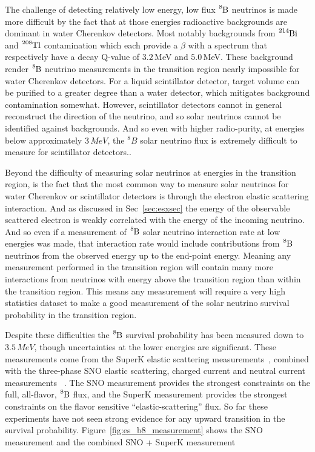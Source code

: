 The challenge of detecting relatively low energy, low flux $\ce{^{8}B}$ neutrinos
is made more difficult by the fact that at those energies radioactive backgrounds
are dominant in water Cherenkov detectors.
Most notably backgrounds from $\ce{^{214}Bi}$ and $\ce{^{208}Tl}$ contamination
which each provide a $\beta$ with a spectrum that respectively have a decay
Q-value of $3.2$\,MeV and $5.0$\,MeV.
These background render $\ce{^{8}B}$ neutrino measurements in the transition
region nearly impossible for water Cherenkov detectors.
For a liquid scintillator detector, target volume can be purified to a greater
degree than a water detector, which mitigates
background contamination somewhat.
However, scintillator detectors cannot in general reconstruct the direction
of the neutrino, and so solar neutrinos cannot be identified against backgrounds.
And so even with higher radio-purity, at energies below approximately $3\,MeV$,
the $^{8}B$ solar neutrino flux is extremely difficult to measure for scintillator detectors..

Beyond the difficulty of measuring solar neutrinos at energies in the transition
region, is the fact that the most common way to measure solar neutrinos for
water Cherenkov or scintillator detectors
is through the electron elastic scattering interaction.
And as discussed in Sec~\ref{sec:esxsec} the energy of the observable
scattered electron is weakly correlated with the energy of the incoming neutrino.
And so even if a measurement of $\ce{^{8}B}$ solar neutrino interaction rate at low energies was
made, that interaction rate would include contributions from $\ce{^{8}B}$ neutrinos
from the observed energy up to the end-point energy.
Meaning any measurement performed in the transition region will contain many
more interactions from neutrinos with energy above the transition region than within
the transition region.
This means any measurement will require a very high statistics dataset to make
a good measurement of the solar neutrino survival probability in the transition
region.

Despite these difficulties the $\ce{^{8}B}$ survival probability has been measured
down to $3.5\,MeV$, though uncertainties at the lower energies are significant.
These measurements come from the SuperK elastic scattering measurements~\citep{superk4}, combined
with the three-phase SNO elastic scattering, charged current and neutral current measurements
~\citep{sno_combined}.
The SNO measurement provides the strongest constraints on the full, all-flavor, $\ce{^{8}B}$
flux, and the SuperK measurement provides the strongest constraints on the
flavor sensitive ``elastic-scattering'' flux.
So far these experiments have not seen strong evidence for any
upward transition in the survival probability.
Figure~\ref{fig:es_b8_measurement} shows the SNO measurement
and the combined SNO + SuperK  measurement

